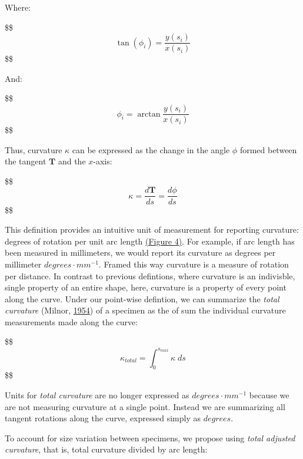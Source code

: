 \documentclass[]{article}
\begin{document}
Where:

\$\$ \begin{equation}
\tag{6}

\tan(\phi_i) = \frac{y(s_i)}{x(s_i)}

\end{equation} \$\$

And:

\$\$ \begin{equation}
\tag{7}

\phi_i = \arctan{\frac{y(s_i)}{x(s_i)}}

\end{equation} \$\$

Thus, curvature \(\kappa\) can be expressed as the change in the angle
\(\phi\) formed between the tangent \(\mathbf{T}\) and the \(x\)-axis:

\$\$ \begin{equation}
\tag{8}

\kappa = \frac{d \mathbf{T}}{ds} = \frac{d\phi}{ds}

\end{equation} \$\$

This definition provides an intuitive unit of measurement for reporting
curvature: degrees of rotation per unit arc length
\href{Figure_4.jpg}{(Figure 4)}. For example, if arc length has been
measured in millimeters, we would report its curvature as degrees per
millimeter \(degrees \cdot mm^{-1}\). Framed this way curvature is a
measure of rotation per distance. In contrast to previous defintions,
where curvature is an indivisble, single property of an entire shape,
here, curvature is a property of every point along the curve. Under our
point-wise defintion, we can summarize the \emph{total curvature}
(Milnor, \protect\hyperlink{ref-milnor_1954}{1954}) of a specimen as the
of sum the individual curvature measurements made along the curve:

\$\$ \begin{equation}
\tag{6}

\kappa_{total} = \int_{0}^{s_{max}} \kappa \; ds 

\end{equation} \$\$

Units for \emph{total curvature} are no longer expressed as
\(degrees \cdot mm^{-1}\) because we are not measuring curvature at a
single point. Instead we are summarizing all tangent rotations along the
curve, expressed simply as \(degrees\).

To account for size variation between specimens, we propose using
\emph{total adjusted curvature}, that is, total curvature divided by arc
length:
\end{document}
